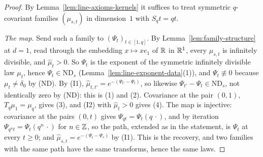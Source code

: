 \begin{proof}
\leanok
{}
By Lemma~\ref{lem:line-axioms-kernels} it suffices to treat symmetric $q$-covariant families
$(\mu_{s,t})$ in dimension~$1$ with $S_qt = qt$.

\emph{The map.} Send such a family to $(\Psi_t)_{t \in [1,q]}$. By
Lemma~\ref{lem:family-structure} at $d = 1$, read through the embedding $x \mapsto xe_1$ of $\mathbb{R}$
in $\mathbb{R}^1$, every $\mu_{s,t}$ is infinitely divisible, and $\widehat\mu_t > 0$. So $\Psi_t$ is the
exponent of the symmetric infinitely divisible law $\mu_t$, hence $\Psi_t \in \mathrm{ND}_s$
(Lemma~\ref{lem:line-exponent-data}(1)), and $\Psi_t \not\equiv 0$ because $\mu_t \ne \delta_0$
by (ND). By (I1), $\widehat\mu_{t,t'} = e^{-(\Psi_{t'} - \Psi_t)}$, so likewise
$\Psi_{t'} - \Psi_t \in \mathrm{ND}_s$, not identically zero by (ND): this is (1) and (2).
Covariance at the pair $(0, 1)$, $T_q\mu_1 = \mu_q$, gives (3), and (I2) with
$\widehat\mu_t > 0$ gives (4). The map is injective: covariance at the pairs $(0, t)$ gives
$\Psi_{qt} = \Psi_t(q\,\cdot)$, and by iteration $\Psi_{q^nt} = \Psi_t(q^n\,\cdot)$ for
$n \in \mathbb{Z}$, so the path, extended as in the statement, is $\Psi_t$ at every $t \ge 0$; and
$\widehat\mu_{s,t} = e^{-(\Psi_t - \Psi_s)}$ by (I1). This is the recovery, and two families
with the same path have the same transforms, hence the same laws.


\end{proof}
